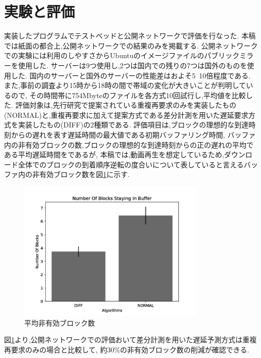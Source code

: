 \documentclass{ltjsarticle}
\begin{document}
\section{実験と評価}
\vspace{-2mm}
実装したプログラムでテストベッドと公開ネットワークで評価を行なった.
本稿では紙面の都合上,公開ネットワークでの結果のみを掲載する.
公開ネットワークでの実験には利用のしやすさからUbuntuのイメージファイルのパブリックミラーを使用した.
サーバーは9つ使用し,2つは国内での残りの7つは国外のものを使用した.
国内のサーバーと国外のサーバーの性能差はおよそ5~10倍程度である.
また,事前の調査より15時から18時の間で帯域の変化が大きいことが判明しているので,
その時間帯に754Mbyteのファイルを各方式10回試行し,平均値を比較した.
評価対象は,先行研究で提案されている重複再要求のみを実装したもの(NORMAL)と,重複再要求に加えて提案方式である差分計測を用いた遅延要求方式を実装したもの(DIFF)の2種類である.
評価項目は,ブロックの理想的な到達時刻からの遅れを表す遅延時間の最大値である初期バッファリング時間,
バッファ内の非有効ブロックの数,ブロックの理想的な到達時刻からの正の遅れの平均である平均遅延時間をであるが,
本稿では,動画再生を想定しているため,ダウンロード全体でのブロックの到着順序逆転の度合いについて表していると言えるバッファ内の非有効ブロック数を図\ref{nsbpub}に示す.
\vspace{-4mm}
\begin{figure}[h]
	\centering
	\includegraphics[width=9cm]{figure/nsb-g.pdf}
	\caption{平均非有効ブロック数}
	\label{nsbpub}
\end{figure}
\vspace{-5mm}

図\ref{nsbpub}より,公開ネットワークでの評価おいて差分計測を用いた遅延予測方式は重複再要求のみの場合と比較して,
約30\%の非有効ブロック数の削減が確認できる.
\vspace{-5mm}
\end{document}
